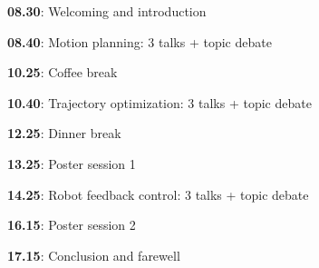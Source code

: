 \documentclass[conference]{IEEEtran}
\begin{document}
\textbf{08.30}: Welcoming and introduction

\textbf{08.40}: Motion planning: 3 talks + topic debate

\textbf{10.25}: Coffee break

\textbf{10.40}: Trajectory optimization: 3 talks + topic debate

\textbf{12.25}: Dinner break

\textbf{13.25}: Poster session 1

\textbf{14.25}: Robot feedback control: 3 talks + topic debate

\textbf{16.15}: Poster session 2

\textbf{17.15}: Conclusion and farewell
\end{document}
